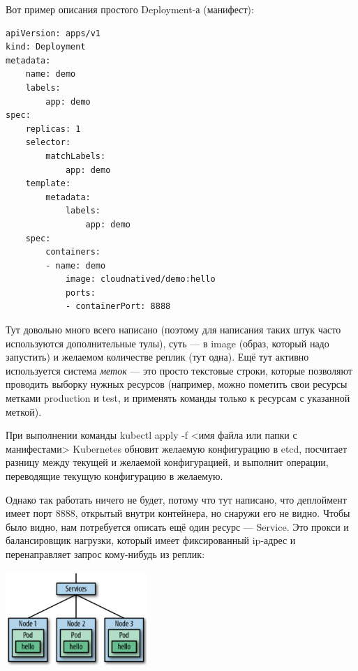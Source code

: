 \documentclass{../../text-style}
\begin{document}
Вот пример описания простого Deployment-а (манифест):

\begin{verbatim}
apiVersion: apps/v1
kind: Deployment
metadata:
    name: demo
    labels:
        app: demo
spec:
    replicas: 1
    selector:
        matchLabels:
            app: demo
    template:
        metadata:
            labels:
                app: demo
    spec:
        containers:
        - name: demo
            image: cloudnatived/demo:hello
            ports:
            - containerPort: 8888
\end{verbatim}


Тут довольно много всего написано (поэтому для написания таких штук часто используются дополнительные тулы), суть --- в image (образ, который надо запустить) и желаемом количестве реплик (тут одна). Ещё тут активно используется система \emph{меток} --- это просто текстовые строки, которые позволяют проводить выборку нужных ресурсов (например, можно пометить свои ресурсы метками production и test, и применять команды только к ресурсам с указанной меткой).

При выполнении команды kubectl apply -f <имя файла или папки с манифестами> Kubernetes обновит желаемую конфигурацию в etcd, посчитает разницу между текущей и желаемой конфигурацией, и выполнит операции, переводящие текущую конфигурацию в желаемую.

Однако так работать ничего не будет, потому что тут написано, что деплоймент имеет порт 8888, открытый внутри контейнера, но снаружи его не видно. Чтобы было видно, нам потребуется описать ещё один ресурс --- Service. Это прокси и балансировщик нагрузки, который имеет фиксированный ip-адрес и перенаправляет запрос кому-нибудь из реплик:

\begin{center}
    \includegraphics[width=0.4\textwidth]{kubernetesServices.png}
\end{center}
\end{document}
